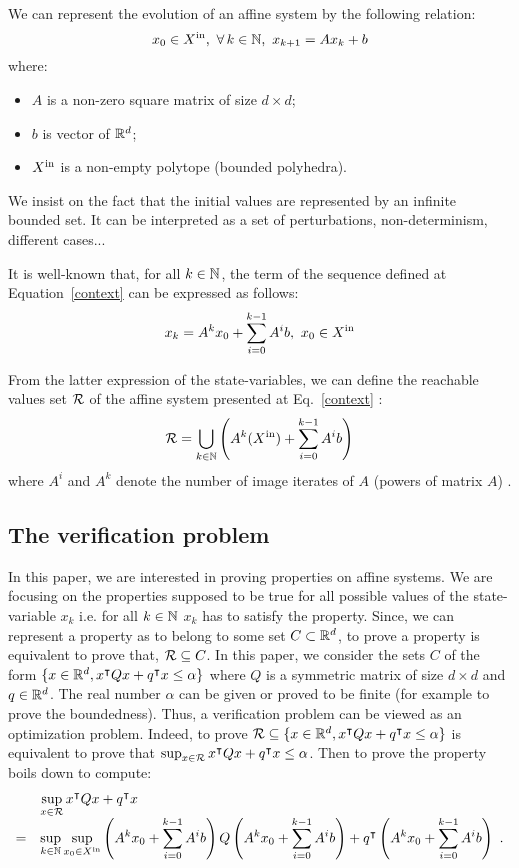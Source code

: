 \documentclass[10pt]{article}
\begin{document}
We can represent the evolution of an affine system by the following relation:
\begin{equation}
\label{context}
x_0\in X^\mathrm{in},\ \forall\, k\in\mathbb{N},\ x_{k+1}=A x_k + b  
\end{equation}
where:
\begin{itemize}
\item $A$ is a non-zero square matrix of size $d\times d$;
\item $b$ is vector of $\mathbb R^d$;
\item  $X^\mathrm{in}$ is a non-empty polytope (bounded polyhedra). 
\end{itemize}
We insist on the fact that the initial values are represented by an infinite bounded set. It can be interpreted as a set of perturbations, non-determinism, different cases...

It is well-known that, for all $k\in\mathbb{N}$, the term of the sequence defined at Equation~\eqref{context} can be expressed as follows:
\[
x_k=A^k x_0+ \sum_{i=0}^{k-1} A^i b,\ x_0\in\xin
\]

From the latter expression of the state-variables, we can define the reachable values set $\mathcal{R}$ of the affine system presented at Eq.~\eqref{context} :
\begin{equation}
\label{reach}
\mathcal{R}=\bigcup_{k\in \mathbb{N}} \left(A^{k}(X^\mathrm{in})+\sum_{i=0}^{k-1} A^i b\right)
\end{equation}
where $A^i$ and $A^k$ denote the number of image iterates of $A$ (powers of matrix $A$) . 

\subsection{The verification problem}
In this paper, we are interested in proving properties on affine systems. We are focusing on the properties supposed to be true for all possible values of the state-variable $x_k$ i.e. for all $k\in\mathbb{N}$ $x_k$ has to satisfy the property. Since, we can represent a property as to belong to some set $C\subset \mathbb R^d$, to prove a property is equivalent to prove that, $\mathcal{R}\subseteq C$. In this paper, we consider the sets $C$  of the form $\{x\in\mathbb R^d, x^\intercal Q x+q^\intercal x\leq \alpha\}$ where $Q$ is a symmetric matrix of size $d\times d$ and $q\in\mathbb R^d$. The real number $\alpha$ can be given or proved to be finite (for example to prove the boundedness).  Thus, a verification problem can be viewed as an optimization problem. Indeed, to prove $\mathcal{R}\subseteq \{x\in\mathbb R^d, x^\intercal Q x+q^\intercal x\leq \alpha\}$ is equivalent to prove that
$\sup_{x\in\mathcal{R}} x^\intercal Q x+q^\intercal x\leq \alpha$.
Then to prove the property boils down to compute: 
\begin{equation}
\label{pbopt}
\begin{array}{ll}
&\displaystyle{\sup_{x\in\mathcal{R}} x^\intercal Q x+q^\intercal x}\\
=&\displaystyle{\sup_{k\in\mathbb{N}}\sup_{x_0\in X^\mathrm{in}}  \left(A^k x_0+ \sum_{i=0}^{k-1} A^i b \right) Q \left( A^k x_0+ \sum_{i=0}^{k-1} A^i b\right) +q^\intercal \left(A^k x_0+ \sum_{i=0}^{k-1} A^i b\right)}\enspace .
\end{array}
\end{equation} 
\end{document}
